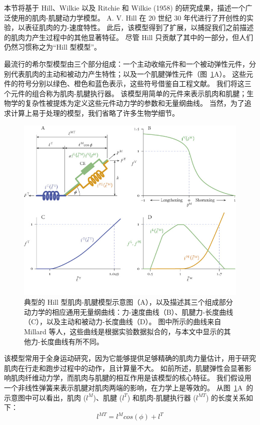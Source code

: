 本节将基于 Hill\cite{hill1938heat}、Wilkie \cite{wilkie1956mechanical} 以及 Ritchie 和 Wilkie (1958) 的研究成果，描述一个广泛使用的肌肉-肌腱动力学模型。
A. V. Hill 在 20 世纪 30 年代进行了开创性的实验，以表征肌肉的力-速度特性。
此后，该模型得到了扩展，以捕捉我们之前描述的肌肉力产生过程中的其他显著特征。
尽管 Hill 只贡献了其中的一部分，但人们仍然习惯称之为“Hill 型模型”。


最流行的希尔型模型由三个部分组成：一个主动收缩元件和一个被动弹性元件，分别代表肌肉的主动和被动力产生特性；以及一个肌腱弹性元件（图~\ref{fig:5_11}A）。
这些元件的符号分别以绿色、橙色和蓝色表示，这些符号借鉴自工程文献。
我们将这三个元件的组合称为肌肉-肌腱执行器。
该模型用简单的元件来表示肌肉和肌腱；生物学的复杂性被提炼为定义这些元件动力学的参数和无量纲曲线。
当然，为了追求计算上易于处理的模型，我们省略了许多生物学细节。


\begin{figure}[!htb]
	\centering
	\includegraphics[width=0.75\linewidth]{chap5/5_11}
	\caption{典型的 Hill 型肌肉-肌腱模型示意图（A），以及描述其三个组成部分动力学的相应通用无量纲曲线：力-速度曲线（B）、肌腱力-长度曲线（C），以及主动和被动力-长度曲线（D）。
		图中所示的曲线来自 Millard 等人\cite{millard2013flexing}，这些曲线是根据实验数据拟合的，与本文中显示的其他力-长度曲线有所不同。 \label{fig:5_11}}
\end{figure}


该模型常用于全身运动研究，因为它能够提供足够精确的肌肉力量估计，用于研究肌肉在行走和跑步过程中的动作，且计算量不大。
如前所述，肌腱弹性会显著影响肌肉纤维动力学，而肌肉与肌腱的相互作用是该模型的核心特征。
我们假设用一个非线性弹簧来表示肌腱对肌肉两端的影响，在力学上是等效的。
从图~\ref{fig:5_11}A~的示意图中可以看出，肌肉 ($l^M$)、肌腱 ($l^T$) 和肌肉-肌腱执行器 ($l^{MT}$) 的长度关系如下：
\begin{equation}
	l^{MT} = l^M cos(\phi) + l^T
	\label{eq:5_8}
\end{equation}




